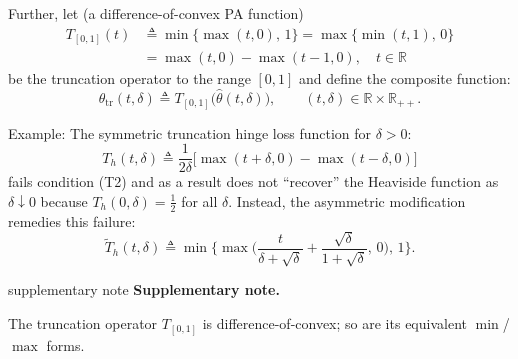 \documentclass[aspectratio=169,xcolor=dvipsnames]{beamer}
\newenvironment{supplementarynote}{%
  \vspace{0.08cm}%
  \begin{beamercolorbox}[
    wd=\textwidth,sep=0.08cm,leftskip=0.08cm,rightskip=0.08cm
  ]{supplementary note}%
  \footnotesize
  \textcolor{SupplementAccent}{\textbf{Supplementary note.}}\enspace
}{%
  \end{beamercolorbox}%
}
\begin{document}
\begin{frame}
  \footnotesize
  \setlength{\abovedisplayskip}{4pt}
  \setlength{\belowdisplayskip}{4pt}

  Further, let {\color{MediumBlue}(a difference-of-convex PA function)}
  \[
    \begin{aligned}
      T_{[0,1]}(t) &\triangleq\min\{\max(t,0),\,1\}
        =\max\{\min(t,1),\,0\}\\
      &=\max(t,0)-\max(t-1,0),\quad t\in\mathbb{R}
    \end{aligned}
  \]
  be the truncation operator to the range $[0,1]$ and define the composite
  function:
  \[
    \theta_{\mathrm{tr}}(t,\delta)\triangleq
    T_{[0,1]}\bigl(\widehat{\theta}(t,\delta)\bigr),\qquad
    (t,\delta)\in\mathbb{R}\times\mathbb{R}_{++}.
  \]

  {\color{MediumBlue}Example:} The \textcolor{MediumRed}{symmetric}
  truncation hinge loss function for $\delta>0$:
  \[
    T_h(t,\delta)\triangleq\frac{1}{2\delta}
    \bigl[\max(t+\delta,0)-\max(t-\delta,0)\bigr]
  \]
  fails condition (T2) and as a result does not ``recover'' the Heaviside
  function as $\delta\downarrow 0$ because $T_h(0,\delta)=\tfrac{1}{2}$ for
  all $\delta$. Instead, the \textcolor{MediumRed}{asymmetric} modification
  remedies this failure:
  \[
    \widetilde{T}_h(t,\delta)\triangleq\min\biggl\{\max\biggl(
      \frac{t}{\delta+\sqrt{\delta}}+\frac{\sqrt{\delta}}{1+\sqrt{\delta}},\,
      0\biggr),\,1\biggr\}.
  \]

  \begin{supplementarynote}
    The truncation operator $T_{[0,1]}$ is difference-of-convex; so are its
    equivalent $\min$/$\max$ forms.
  \end{supplementarynote}
\end{frame}
\end{document}
